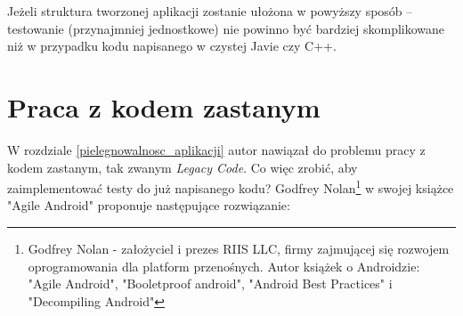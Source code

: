 Jeżeli struktura tworzonej aplikacji zostanie ułożona w powyższy sposób – testowanie (przynajmniej jednostkowe) nie powinno być bardziej skomplikowane niż w przypadku kodu napisanego w czystej Javie czy C++.


\section{Praca z kodem zastanym}
\label{legacy_code}
W rozdziale \ref{pielegnowalnosc_aplikacji} autor nawiązał do problemu pracy z kodem zastanym, tak zwanym \textit{Legacy Code}.
Co więc zrobić, aby zaimplementować testy do już napisanego kodu? Godfrey Nolan\footnote{Godfrey Nolan - założyciel i prezes RIIS LLC, firmy zajmującej się rozwojem oprogramowania dla platform przenośnych. Autor książek o Androidzie: "Agile Android", "Booletproof android", "Android Best Practices" i "Decompiling Android"} w swojej książce "Agile Android"\cite{bib:agile:android} proponuje następujące rozwiązanie:


